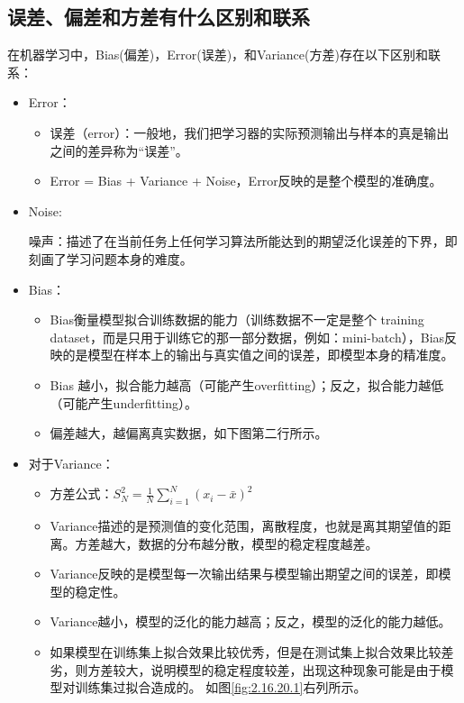 \subsection{误差、偏差和方差有什么区别和联系}

在机器学习中，Bias(偏差)，Error(误差)，和Variance(方差)存在以下区别和联系：

\begin{itemize}

	\item Error：

		\begin{itemize}
			\itemsep0em 
			\item 误差（error）：一般地，我们把学习器的实际预测输出与样本的真是输出之间的差异称为“误差”。
			\item Error = Bias + Variance + Noise，Error反映的是整个模型的准确度。
		\end{itemize}

	\item Noise:

		噪声：描述了在当前任务上任何学习算法所能达到的期望泛化误差的下界，即刻画了学习问题本身的难度。

	\item Bias：

		\begin{itemize}
			\itemsep0em 
			\item Bias衡量模型拟合训练数据的能力（训练数据不一定是整个 training dataset，而是只用于训练它的那一部分数据，例如：mini-batch），Bias反映的是模型在样本上的输出与真实值之间的误差，即模型本身的精准度。
			\item Bias 越小，拟合能力越高（可能产生overfitting）；反之，拟合能力越低（可能产生underfitting）。
			\item 偏差越大，越偏离真实数据，如下图第二行所示。
		\end{itemize}
	\item 对于Variance：
		\begin{itemize}
			\item 方差公式：$S_{N}^{2}=\frac{1}{N}\sum_{i=1}^{N}(x_{i}-\bar{x})^{2}$
			\item Variance描述的是预测值的变化范围，离散程度，也就是离其期望值的距离。方差越大，数据的分布越分散，模型的稳定程度越差。
			\item Variance反映的是模型每一次输出结果与模型输出期望之间的误差，即模型的稳定性。
			\item Variance越小，模型的泛化的能力越高；反之，模型的泛化的能力越低。
			\item 如果模型在训练集上拟合效果比较优秀，但是在测试集上拟合效果比较差劣，则方差较大，说明模型的稳定程度较差，出现这种现象可能是由于模型对训练集过拟合造成的。 如图\ref{fig:2.16.20.1}右列所示。


\end{itemize}
\end{itemize}
